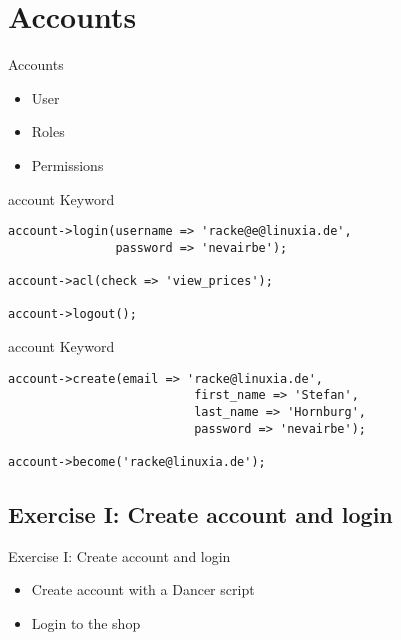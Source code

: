 
\section{Accounts}
\begin{frame}{Accounts}
\begin{itemize}
\item User
\item Roles
\item Permissions
\end{itemize}
\end{frame}

\begin{frame}[fragile]{account Keyword}
\begin{lstlisting}
account->login(username => 'racke@e@linuxia.de',
               password => 'nevairbe');

account->acl(check => 'view_prices');

account->logout();
\end{lstlisting}
\end{frame}

\begin{frame}[fragile]{account Keyword}
\begin{lstlisting}
account->create(email => 'racke@linuxia.de',
                          first_name => 'Stefan',
                          last_name => 'Hornburg',
                          password => 'nevairbe');

account->become('racke@linuxia.de');
\end{lstlisting}
\end{frame}

\subsection{Exercise I: Create account and login}
\begin{frame}{Exercise I: Create account and login}
\begin{itemize}
\item Create account with a Dancer script
\item Login to the shop
\end{itemize}
\end{frame}

